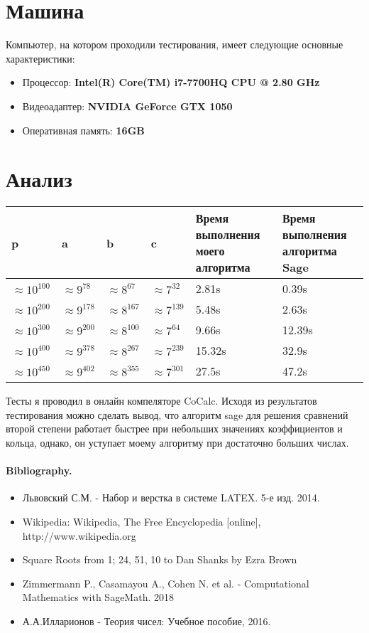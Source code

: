 \documentclass[11pt]{article}
\begin{document}
	\section{Машина}
	Компьютер, на котором проходили тестирования, имеет следующие основные характеристики:
	\begin{itemize}
		\item Процессор: \textbf{Intel(R) Core(TM) i7-7700HQ CPU @ 2.80 GHz}
			\item Видеоадаптер: \textbf{NVIDIA GeForce GTX 1050}
			\item Оперативная память: \textbf{16GB}
		\end{itemize}
		\section{Анализ}
		
		\begin{tabular}{|p{2cm}|p{2cm}|p{2cm}|p{2cm}|p{3.5cm}|p{3.5cm}|}
			\hline
			p & a & b & c & Время выполнения моего алгоритма & Время выполнения алгоритма Sage\\
			\hline
			$\approx 10^{100}$ &$\approx9^{78}$ &$\approx8^{67}$ & $\approx7^{32}$ & 2.81s & 0.39s\\
			$\approx10^{200}$ &$\approx9^{178}$ &$\approx8^{167}$ & $\approx7^{139}$ & 5.48s & 2.63s\\
			$\approx10^{300}$ & $\approx9^{200}$&$\approx8^{100}$ & $\approx7^{64}$ & 9.66s & 12.39s\\
			$\approx10^{400}$ &$\approx9^{378}$ &$\approx8^{267}$ & $\approx7^{239}$ & 15.32s & 32.9s\\
		    $\approx10^{450}$&$\approx9^{402}$ &$\approx8^{355}$ & $\approx7^{301}$ & 27.5s & 47.2s\\
			\hline
		\end{tabular}
		
		Тесты я проводил в онлайн компеляторе CoCalc. Исходя из результатов тестирования можно сделать вывод, что алгоритм sage для решения сравнений второй степени работает быстрее при небольших значениях коэффициентов и кольца, однако, он уступает моему алгоритму при достаточно больших числах.
		
		\paragraph{Bibliography.}
		\begin{itemize}
			\item Львовский С.М. - Набор и верстка в системе LATEX. 5-е изд. 2014.
			\item Wikipedia: Wikipedia, The Free Encyclopedia [online], http://www.wikipedia.org
			\item Square Roots from 1; 24, 51, 10 to Dan Shanks by Ezra Brown
			\item Zimmermann P., Casamayou A., Cohen N. et al. - Computational Mathematics with SageMath. 2018
			\item А.А.Илларионов - Теория чисел: Учебное пособие, 2016. 
		\end{itemize}
		
	
\end{document}
